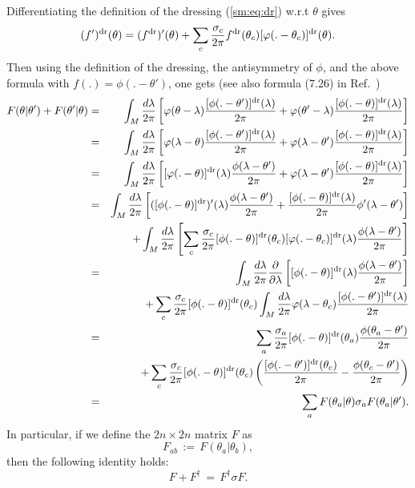 \documentclass[twocolumn,amsfonts,showpacs,superscriptaddress]{revtex4-1}
\begin{document}
\begin{widetext}
Differentiating the definition of the dressing (\ref{sm:eq:dr}) w.r.t $\theta$ gives
\begin{equation}
	\label{sm:eq:fdrprime}
	(f')^{\rm dr} (\theta) = (f^{\rm dr})'(\theta) + \sum_c \frac{\sigma_c}{2\pi} f^{\rm dr} (\theta_c) [\varphi(.-\theta_c) ]^{\rm dr} (\theta) .
\end{equation}
Then using the definition of the dressing, the antisymmetry of $\phi$, and the above formula with $f(.) = \phi(.-\theta')$, one gets (see also formula (7.26) in Ref.~\cite{eliens2017quantum})
\begin{eqnarray*}
	 F(\theta | \theta') + F(\theta' | \theta)  &=&
	\int_M \frac{d\lambda}{2\pi} \left[ \varphi(\theta-\lambda) \frac{[\phi(.-\theta')]^{\rm dr}(\lambda)}{2\pi} + \varphi(\theta'-\lambda) \frac{[\phi(.-\theta)]^{\rm dr}(\lambda)}{2\pi} \right] \\
	&=& \int_M \frac{d\lambda}{2\pi} \left[ \varphi(\lambda-\theta) \frac{[\phi(.-\theta')]^{\rm dr}(\lambda)}{2\pi} + \varphi(\lambda-\theta') \frac{[\phi(.-\theta)]^{\rm dr}(\lambda)}{2\pi} \right] \\
	&=& \int_M \frac{d\lambda}{2\pi} \left[ [\varphi(.-\theta)]^{\rm dr} (\lambda) \frac{\phi(\lambda-\theta')}{2\pi} + \varphi(\lambda-\theta') \frac{[\phi(.-\theta)]^{\rm dr}(\lambda)}{2\pi} \right]  \\
	&=& \int_M \frac{d\lambda}{2\pi} \left[ ([\phi(.-\theta)]^{\rm dr} )'(\lambda) \frac{\phi(\lambda-\theta')}{2\pi} + \frac{[\phi(.-\theta)]^{\rm dr}(\lambda)}{2\pi} \phi'(\lambda-\theta')  \right]  \\
	&& +  \int_M \frac{d\lambda}{2\pi} \left[ \sum_c \frac{\sigma_c}{2\pi} [\phi(.-\theta)]^{\rm dr} (\theta_c) [\varphi(.- \theta_c)]^{\rm dr}(\lambda)  \frac{\phi(\lambda-\theta')}{2\pi}  \right] \\
	&=& \int_M \frac{d\lambda}{2\pi} \frac{\partial}{\partial \lambda}\left[  [\phi(.-\theta)]^{\rm dr} (\lambda) \frac{\phi(\lambda-\theta')}{2\pi} \right]  \\
	&& +  \sum_c \frac{\sigma_c}{2\pi} [\phi(.-\theta)]^{\rm dr} (\theta_c) \int_M \frac{d\lambda}{2\pi}  \varphi(\lambda- \theta_c)  \frac{[\phi(.-\theta')]^{\rm dr}(\lambda)}{2\pi}  \\	
	&=& \sum_a \frac{\sigma_a}{2\pi}   [\phi(.-\theta)]^{\rm dr} (\theta_a) \frac{\phi(\theta_a-\theta')}{2\pi}    \\
	&& +  \sum_c \frac{\sigma_c}{2\pi} [\phi(.-\theta)]^{\rm dr} (\theta_c) \left(  \frac{[\phi(.-\theta')]^{\rm dr}(\theta_c)}{2\pi} -  \frac{\phi(\theta_c-\theta')}{2\pi} \right) \\	
	&=&  \sum_a  F(\theta_a | \theta) \sigma_a  F(\theta_a | \theta').
\end{eqnarray*}
In particular, if we define the $2n \times 2n$ matrix $F$ as
\begin{equation}
	F_{ab} \, := \, F(\theta_a | \theta_b), 
\end{equation}
then the following identity holds:
\begin{equation}
	\label{sm:eq:FFdag}
	F + F^\dagger \, = \, F^\dagger  \sigma  F.
\end{equation}



\end{widetext}
\end{document}
